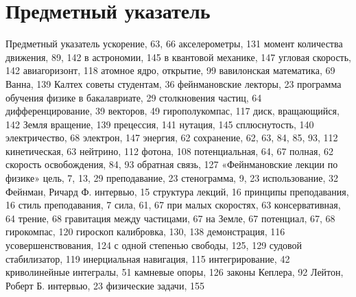 \documentclass[11pt,oneside]{article}
\begin{document}
\clearpage


\section*{Предметный указатель}



\label{tips-sec-15-предметный-указатель}


Предметный указатель ускорение, 63, 66 акселерометры, 131 момент количества движения, 89, 142 в астрономии, 145 в квантовой механике, 147 угловая скорость, 142 авиагоризонт, 118 атомное ядро, открытие, 99 вавилонская математика, 69 Ванна, 139 Калтех советы студентам, 36 фейнмановские лекторы, 23 программа обучения физике в бакалавриате, 29 столкновения частиц, 64 дифференцирование, 39 векторов, 49 гирополукомпас, 117 диск, вращающийся, 142 Земля вращение, 139 прецессия, 141 нутация, 145 сплюснутость, 140 электричество, 68 электрон, 147 энергия, 62 сохранение, 62, 63, 84, 85, 93, 112 кинетическая, 63 нейтрино, 112 фотона, 108 потенциальная, 64, 67 полная, 62 скорость освобождения, 84, 93 обратная связь, 127 «Фейнмановские лекции по физике» цель, 7, 13, 29 преподавание, 23 стенограмма, 9, 23 использование, 32 Фейнман, Ричард Ф. интервью, 15 структура лекций, 16 принципы преподавания, 16 стиль преподавания, 7 сила, 61, 67 при малых скоростях, 63 консервативная, 64 трение, 68 гравитация между частицами, 67 на Земле, 67 потенциал, 67, 68 гирокомпас, 120 гироскоп калибровка, 130, 138 демонстрация, 116 усовершенствования, 124 с одной степенью свободы, 125, 129 судовой стабилизатор, 119 инерциальная навигация, 115 интегрирование, 42 криволинейные интегралы, 51 камневые опоры, 126 законы Кеплера, 92 Лейтон, Роберт Б. интервью, 23 физические задачи, 155\par
\end{document}
